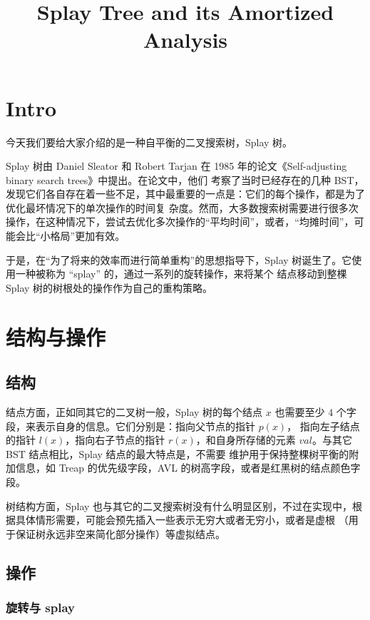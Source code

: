 \documentclass{ctexart}
\title{Splay Tree and its Amortized Analysis}
\begin{document}
    \maketitle

    \section{Intro}

    今天我们要给大家介绍的是一种自平衡的二叉搜索树，Splay 树。

    Splay 树由 Daniel Sleator 和 Robert Tarjan 在 1985 年的论文《Self-adjusting binary search trees》中提出。在论文中，他们
    考察了当时已经存在的几种 BST，发现它们各自存在着一些不足，其中最重要的一点是：它们的每个操作，都是为了优化最坏情况下的单次操作的时间复
    杂度。然而，大多数搜索树需要进行很多次操作，在这种情况下，尝试去优化多次操作的“平均时间”，或者，“均摊时间”，可能会比“小格局”更加有效。

    于是，在“为了将来的效率而进行简单重构”的思想指导下，Splay 树诞生了。它使用一种被称为 ``splay'' 的，通过一系列的旋转操作，来将某个
    结点移动到整棵 Splay 树的树根处的操作作为自己的重构策略。

    \section{结构与操作}
    \subsection{结构}

    结点方面，正如同其它的二叉树一般，Splay 树的每个结点 $x$ 也需要至少 4 个字段，来表示自身的信息。它们分别是：指向父节点的指针 $p(x)$，
    指向左子结点的指针 $l(x)$，指向右子节点的指针 $r(x)$，和自身所存储的元素 $val$。与其它 BST 结点相比，Splay 结点的最大特点是，不需要
    维护用于保持整棵树平衡的附加信息，如 Treap 的优先级字段，AVL 的树高字段，或者是红黑树的结点颜色字段。

    树结构方面，Splay 也与其它的二叉搜索树没有什么明显区别，不过在实现中，根据具体情形需要，可能会预先插入一些表示无穷大或者无穷小，或者是虚根
    （用于保证树永远非空来简化部分操作）等虚拟结点。

    \subsection{操作}
    \subsubsection{旋转与 splay}
\end{document}
